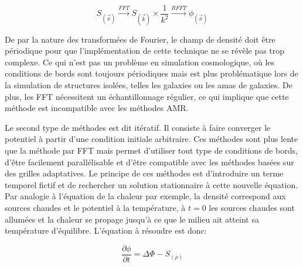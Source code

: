 \begin{equation}
S_{(\vec{x})} \overset{FFT}{\longrightarrow}  S_{(\vec{k})} \times \frac{1}{k^2}  \overset{RFFT}{\longrightarrow}  \phi_{(\vec{x})}
\end{equation}

De par la nature des transformées de Fourier, le champ de densité doit être périodique pour que l'implémentation de cette technique ne se révèle pas trop complexe. 
Ce qui n'est pas un problème en simulation cosmologique, où les conditions de bords sont toujours périodiques mais est plus problématique lors de la simulation de structures isolées, telles les galaxies ou les amas de galaxies. 
De plus, les \ac{FFT} nécessitent un échantillonnage régulier, ce qui implique que cette méthode est incompatible avec les méthodes \ac{AMR}. 

Le second type de méthodes est dit itératif. 
Il consiste à faire converger le potentiel à partir d'une condition initiale arbitraire. 
Ces méthodes sont plus lente que la méthode par \ac{FFT} mais permet d'utiliser tout type de conditions de bords, d'être facilement parallélisable et d'être compatible avec les méthodes basées sur des grilles adaptatives.
Le principe de ces méthodes est d'introduire un terme temporel fictif et de rechercher un solution stationnaire à cette nouvelle équation.
Par analogie à l'équation de la chaleur par exemple, la densité correspond aux sources chaudes et le potentiel à la température, à $t=0$ les sources chaudes sont allumées et la chaleur se propage jusqu'à ce que le milieu ait atteint sa température d'équilibre. 
L'équation à résoudre est donc:

\begin{equation}
\dfrac{\partial \phi}{\partial t} = \Delta \Phi -S_{(\rho)}
\end{equation}




